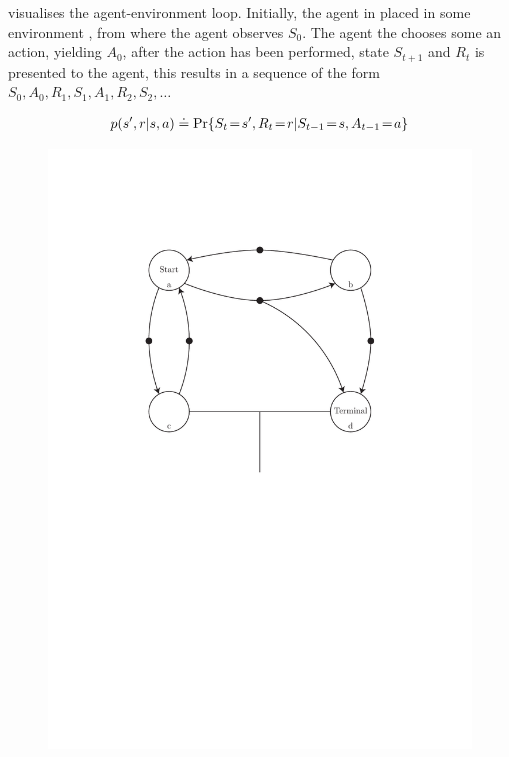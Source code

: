 \vspace*{0.5cm}

 visualises the agent-environment loop. 
Initially, the agent in placed in some environment , from where the agent observes $S_0$.
The agent the chooses some an action, yielding $A_0$, after the action has been performed, state $S_{t+1}$ and $R_t$ is presented to the agent, this results in a sequence of the form $S_0,A_0,R_1,S_1,A_1,R_2,S_2,\ldots$



\begin{align*}
    p(s',r | s,a) \defeq \Pr{S_t\!=\!s', R_t\!=\!r | S_{t-1}\!=\!s, A_{t-1}\!=\!a}
\end{align*}

\begin{figure}[!htb]
    \centering
    \includegraphics[scale=0.5]{../include/MDP.pdf}
    \caption{\todo}
    \label{fig:MDP}
\end{figure}

